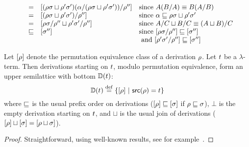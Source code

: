 \begin{definition}
\begin{enumerate}
\begin{enumerate}
{\[\begin{array}{rcll}
      & = &
      {[(\rho\sigma \sqcup \rho'\sigma')(\alpha/(\rho\sigma \sqcup \rho'\sigma'))/\rho'']}
      & \text{since $A(B/A) \equiv B(A/B)$}
      \\
      & = &
      {[(\rho\sigma \sqcup \rho'\sigma')/\rho'']}
      & \text{since $\alpha \sqsubseteq \rho\sigma \sqcup \rho'\sigma'$}
      \\
      & = &
      {[\rho\sigma/\rho'' \sqcup \rho'\sigma'/\rho'']}
      & \text{since $A/C \sqcup B/C \equiv (A \sqcup B)/C$}
      \\
      & \sqsubseteq &
      {[\sigma'']}
      & \text{since ${[\rho\sigma/\rho'']} \sqsubseteq {[\sigma'']}$} \\
      &&& \text{ and ${[\rho'\sigma'/\rho'']} \sqsubseteq {[\sigma'']}$}
      \end{array}
    \]
    }
  \end{enumerate}
\end{enumerate}
\end{definition}

\begin{proposition}
Let ${[\rho]}$ denote the permutation equivalence class of a derivation $\rho$.
Let $t$ be a $\lambda$-term.
Then derivations starting on $t$, modulo permutation equivalence,
form an upper semilattice with bottom $\mathbb{D}(t)$:
\[
  \mathbb{D}(t) \overset{\mathrm{def}}{=} \{{[\rho]} \ |\  \mathsf{src}(\rho) = t\}
\]
where $\sqsubseteq$ is the usual prefix order on derivations (${[\rho]} \sqsubseteq {[\sigma]}$ if $\rho \sqsubseteq \sigma$),
$\bot$ is the empty derivation starting on $t$,
and $\sqcup$ is the usual join of derivations (${[\rho]} \sqcup {[\sigma]} = {[\rho \sqcup \sigma]}$).
\end{proposition}
\begin{proof}
Straightforward, using well-known results, see for example~\cite[Chapter~12]{Barendregt:1984}.
\end{proof}

